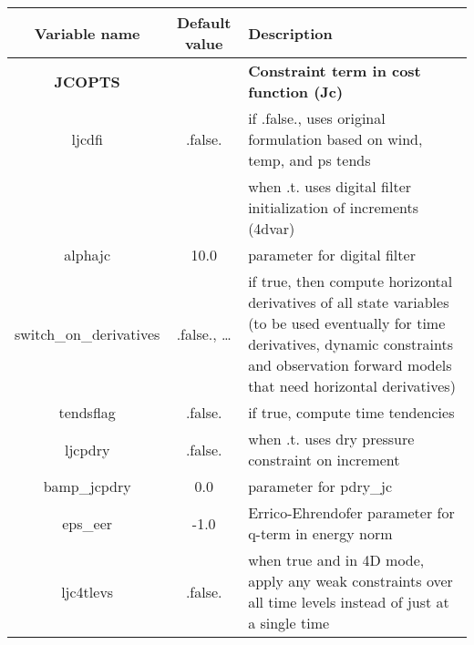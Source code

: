 \begin{table}[h]
 \footnotesize
 \center
 \begin{tabular}{| c | c | p{9cm} |}
 \hline
 Variable name & Default value & Description \\
 \hline
 \textbf{JCOPTS} &   & \textbf{Constraint term in cost function (Jc)} \\
 \hline 
 ljcdfi & .false. & if .false., uses original formulation based on wind, temp, and ps tends \\
        & & when .t. uses digital filter initialization of increments (4dvar) \\
 \hline
 alphajc & 10.0 & parameter for digital filter \\
 \hline
 switch\_on\_derivatives & .false., … & if true, then compute horizontal derivatives of all state variables (to be used eventually for time derivatives, dynamic constraints and observation forward models that need horizontal derivatives) \\
 \hline
 tendsflag & .false. & if true, compute time tendencies \\
 \hline
 ljcpdry & .false. & when .t. uses dry pressure constraint on increment \\
 \hline
 bamp\_jcpdry & 0.0 & parameter for pdry\_jc \\
 \hline
 eps\_eer & -1.0 & Errico-Ehrendofer parameter for q-term in energy norm \\
 \hline
 ljc4tlevs & .false. & when true and in 4D mode, apply any weak constraints over all time levels instead of just at a single time \\
 \hline
 \end{tabular}
\end{table}

